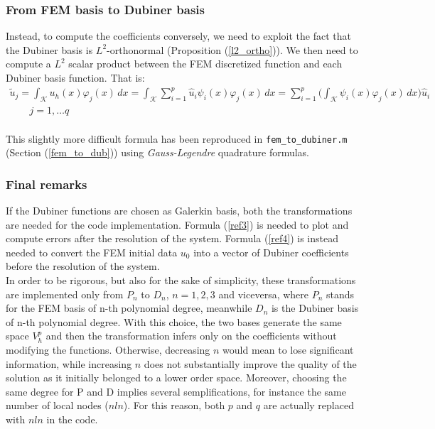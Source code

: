 \documentclass[a4paper,11pt]{article}
\begin{document}
	\subsubsection{From FEM basis to Dubiner basis}
	\noindent Instead, to compute the coefficients conversely, we need to exploit the fact that the Dubiner basis is $L^2$-orthonormal (Proposition (\ref{l2_ortho})). We then need to compute a $L^2$ scalar product between the FEM discretized function and each Dubiner basis function. That is:
	\begin{equation}\label{ref4}
	\begin{gathered}
	\tilde{u}_j = \int_\mathcal{K} u_h(x) \varphi_j(x) \,dx = \int_{\mathcal{K}} \sum_{i=1}^p \hat{u}_i\psi_i(x) \varphi_j(x) \,dx = \sum_{i=1}^p \Big(\int_{\mathcal{K}}\psi_i(x)\varphi_j(x)\,dx \Big) \hat{u}_i \\
	 \qquad j=1,\dots q
	\end{gathered}
	\end{equation}
	\vspace{2mm} \\
	\noindent This slightly more difficult formula has been reproduced in \texttt{fem\_to\_dubiner.m} (Section (\ref{fem_to_dub})) using \emph{Gauss-Legendre} quadrature formulas.
	\subsubsection{Final remarks}\label{dub}
	\noindent If the Dubiner functions are chosen as Galerkin basis, both the transformations are needed for the code implementation. Formula (\ref{ref3}) is needed to plot and compute errors after the resolution of the system. Formula (\ref{ref4}) is instead needed to convert the FEM initial data $u_0$ into a vector of Dubiner coefficients before the resolution of the system.\\
	
	\noindent In order to be rigorous, but also for the sake of simplicity, these transformations are implemented only from $P_n$ to $D_n$, $n=1,2,3$ and viceversa, where $P_n$ stands for the FEM basis of n-th polynomial degree, meanwhile $D_n$ is the Dubiner basis of n-th polynomial degree. With this choice, the two bases generate the same space $V_h^p$ and then the transformation infers only on the coefficients without modifying the functions. Otherwise, decreasing $n$ would mean to lose significant information, while increasing $n$ does not substantially improve the quality of the solution as it initially belonged to a lower order space. Moreover, choosing the same degree for P and D implies several semplifications, for instance the same number of local nodes ($nln$). For this reason, both $p$ and $q$ are actually replaced with $nln$ in the code.
	
\end{document}
